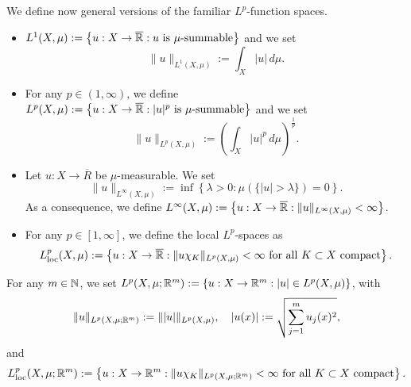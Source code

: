 
We define now general versions of the familiar $L^{p}$-function spaces.

\begin{definition} \hfill
\begin{itemize}[]
\item $L^1(X,\mu) := \left\{ u: X \to \overline{\mathbb{R}} : \text{$u$ is
$\mu$-summable} \right\}$ and we set $$\|u\|_{L^{1}(X, \mu)} := \int_{X} |u| \, d \mu.$$
\item For any $p \in (1, \infty)$, we define $L^p(X,\mu) := \left\{ u: X \to \overline{\mathbb{R}} : \text{$|u|^p$ is
$\mu$-summable} \right\}$ and we set $$\|u\|_{L^{p}(X, \mu)} := \left ( \int_{X} |u|^p \, d \mu \right )^{\frac{1}{p}}.$$
\item Let $u : X \to \overline{R}$ be $\mu$-measurable. We set $$\|u\|_{L^{\infty}(X, \mu)} := \inf \left \{ \lambda > 0 : \mu(\{ |u| > \lambda \}) = 0 \right \}.$$
As a consequence, we define $L^{\infty}(X, \mu) := \left \{ u: X \to \overline{\mathbb{R}} :  \|u\|_{L^{\infty}(X, \mu)} < \infty \right \}$.
\item For any $p \in [1, \infty]$, we define the local $L^{p}$-spaces as
$$L^{p}_{\rm loc}(X,\mu) := \left\{ u: X \to \overline{\mathbb{R}} : \|u\chi_K \|_{L^{p}(X, \mu)} < \infty \text{ for all $K\subset X$ compact} \right\}.$$
\end{itemize}
\item For any $m \in \mathbb{N}$, we set $L^{p}(X, \mu; \mathbb{R}^{m}) := \left \{ u: X \to \mathbb{R}^{m} : |u| \in L^{p}(X, \mu) \right \}$, with
$$ \|u\|_{L^{p}(X, \mu; \mathbb{R}^{m})} := \||u|\|_{L^{p}(X, \mu)}, \quad |u(x)| := \sqrt{\sum_{j = 1}^{m} u_{j}(x)^{2}},$$
and 
$$L^{p}_{\rm loc}(X, \mu; \mathbb{R}^{m}) := \left \{ u : X \to \mathbb{R}^{m} : \|u\chi_K \|_{L^{p}(X, \mu; \mathbb{R}^{m})} < \infty \text{ for all $K\subset X$ compact} \right\}.$$
\end{definition}

